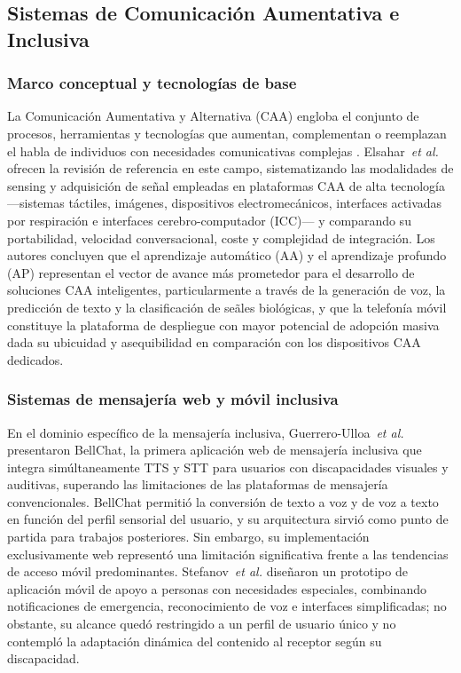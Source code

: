 \documentclass[journal]{IEEEtran}
\begin{document}
	\subsection{Sistemas de Comunicaci\'on Aumentativa e Inclusiva}
	
	\subsubsection{Marco conceptual y tecnolog\'ias de base}
	La Comunicaci\'on Aumentativa y Alternativa (CAA) engloba el conjunto de procesos, herramientas y tecnolog\'ias que aumentan, complementan o reemplazan el habla de individuos con necesidades comunicativas complejas \cite{elsahar2019}. Elsahar~\textit{et al.} \cite{elsahar2019} ofrecen la revisi\'on de referencia en este campo, sistematizando las modalidades de sensing y adquisici\'on de se\~nal empleadas en plataformas CAA de alta tecnolog\'ia ---sistemas t\'actiles, im\'agenes, dispositivos electromec\'anicos, interfaces activadas por respiraci\'on e interfaces cerebro-computador (ICC)--- y comparando su portabilidad, velocidad conversacional, coste y complejidad de integraci\'on. Los autores concluyen que el aprendizaje autom\'atico (AA) y el aprendizaje profundo (AP) representan el vector de avance m\'as prometedor para el desarrollo de soluciones CAA inteligentes, particularmente a trav\'es de la generaci\'on de voz, la predicci\'on de texto y la clasificaci\'on de se\~ales biol\'ogicas, y que la telefon\'ia m\'ovil constituye la plataforma de despliegue con mayor potencial de adopci\'on masiva dada su ubicuidad y asequibilidad en comparaci\'on con los dispositivos CAA dedicados.
	
	\subsubsection{Sistemas de mensajer\'ia web y m\'ovil inclusiva}
	En el dominio espec\'ifico de la mensajer\'ia inclusiva, Guerrero-Ulloa~\textit{et al.} \cite{guerrero2021bellchat} presentaron BellChat, la primera aplicaci\'on web de mensajer\'ia inclusiva que integra sim\'ultaneamente TTS y STT para usuarios con discapacidades visuales y auditivas, superando las limitaciones de las plataformas de mensajer\'ia convencionales. BellChat permiti\'o la conversi\'on de texto a voz y de voz a texto en funci\'on del perfil sensorial del usuario, y su arquitectura sirvi\'o como punto de partida para trabajos posteriores. Sin embargo, su implementaci\'on exclusivamente web represent\'o una limitaci\'on significativa frente a las tendencias de acceso m\'ovil predominantes. Stefanov~\textit{et al.} \cite{stefanov2024} dise\~naron un prototipo de aplicaci\'on m\'ovil de apoyo a personas con necesidades especiales, combinando notificaciones de emergencia, reconocimiento de voz e interfaces simplificadas; no obstante, su alcance qued\'o restringido a un perfil de usuario \'unico y no contempl\'o la adaptaci\'on din\'amica del contenido al receptor seg\'un su discapacidad.
	
\end{document}
